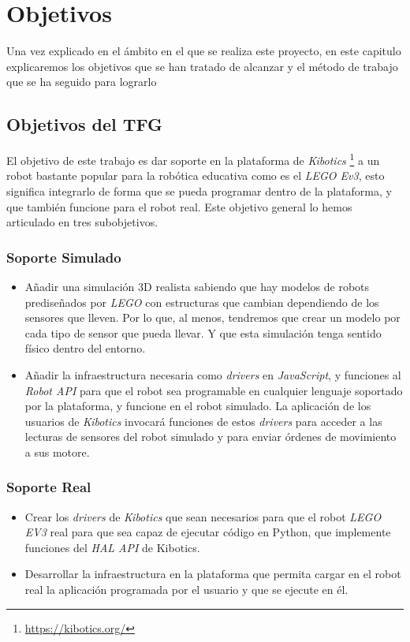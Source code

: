 \chapter{Objetivos}\label{chap:objetivos}
Una vez explicado en el ámbito en el que se realiza este proyecto, en este capitulo explicaremos los objetivos que se han tratado de alcanzar y el método de trabajo que se ha seguido para lograrlo

\section{Objetivos del TFG}
El objetivo de este trabajo es dar soporte en la plataforma de \textit{Kibotics} \footnote{\url{https://kibotics.org/}} a un robot bastante popular para la robótica educativa como es el \textit{LEGO Ev3}, esto significa integrarlo de forma que se pueda programar dentro de la plataforma, y que también funcione para el robot real. Este objetivo general lo hemos articulado en tres subobjetivos.\newline 
\subsection{Soporte Simulado}
\begin{itemize}
    \item Añadir una simulación 3D realista sabiendo que hay modelos de robots prediseñados por \textit{LEGO} con estructuras que cambian dependiendo de los sensores que lleven. Por lo que, al menos, tendremos que crear un modelo por cada tipo de sensor que pueda llevar. Y que esta simulación tenga sentido físico dentro del entorno.
        
    \item Añadir la infraestructura necesaria como \textit{drivers} en \textit{JavaScript}, y funciones al \textit{Robot API} para que el robot sea programable en cualquier lenguaje soportado por la plataforma, y funcione en el robot simulado. La aplicación de los usuarios de \textit{Kibotics} invocará funciones de estos \textit{drivers} para acceder a las lecturas de sensores del robot simulado y para enviar órdenes de movimiento a sus motore.
 
    
\end{itemize}
\subsection{Soporte Real}
\begin{itemize}
    \item Crear los \textit{drivers} de \textit{Kibotics} que sean necesarios para que el robot \textit{LEGO EV3} real para que sea capaz de ejecutar código en Python, que implemente funciones del \textit{HAL API} de Kibotics.
    
        \item Desarrollar la infraestructura en la plataforma que permita cargar en el robot real la aplicación programada por el usuario y que se ejecute en él.
\end{itemize}    
